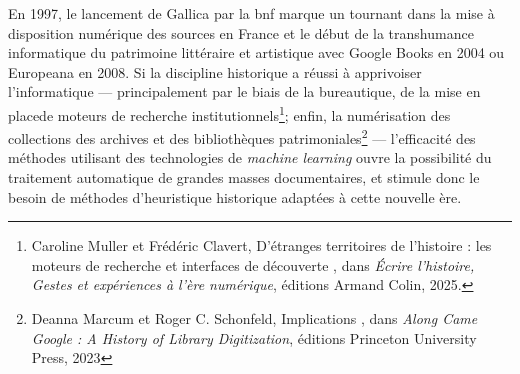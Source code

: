 En 1997, le lancement de Gallica par la \gls{bnf} marque un tournant dans la mise à disposition numérique des sources en France et le début de la transhumance informatique du patrimoine littéraire et artistique avec Google Books en 2004 ou Europeana en 2008. Si la discipline historique a réussi à apprivoiser l’informatique — principalement par le biais de la bureautique, de la mise en placede moteurs de recherche institutionnels\footnote{Caroline Muller et Frédéric Clavert, \og D’étranges territoires de l’histoire : les moteurs de recherche et interfaces de découverte \fg, dans \textit{Écrire l’histoire, Gestes et expériences à l’ère numérique}, éditions Armand Colin, 2025.}; enfin, la numérisation des collections des archives et des bibliothèques patrimoniales\footnote{Deanna Marcum et Roger C. Schonfeld, \og Implications \fg, dans \textit{Along Came Google : A History of Library Digitization}, éditions Princeton University Press, 2023} — l’efficacité des méthodes utilisant des technologies de \textit{machine learning} ouvre la possibilité du traitement automatique de grandes masses documentaires, et stimule donc le besoin de méthodes d’heuristique historique adaptées à cette nouvelle ère.

